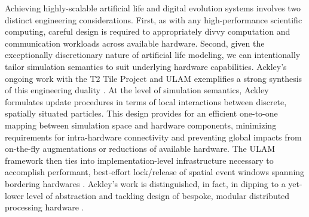 Achieving highly-scalable artificial life and digital evolution systems involves two distinct engineering considerations.
First, as with any high-performance scientific computing, careful design is required to appropriately divvy computation and communication workloads across available hardware.
Second, given the exceptionally discretionary nature of artificial life modeling, we can intentionally tailor simulation semantics to suit underlying hardware capabilities.
Ackley's ongoing work with the T2 Tile Project and ULAM exemplifies a strong synthesis of this engineering duality \citep{ackley2016ulam}.
At the level of simulation semantics, Ackley formulates update procedures in terms of local interactions between discrete, spatially situated particles.
This design provides for an efficient one-to-one mapping between simulation space and hardware components, minimizing requirements for intra-hardware connectivity and preventing global impacts from on-the-fly augmentations or reductions of available hardware.
The ULAM framework then ties into implementation-level infrastructure necessary to accomplish performant, best-effort lock/release of spatial event windows spanning bordering hardwares \citep{ackley2013movable}.
Ackley's work is distinguished, in fact, in dipping to a yet-lower level of abstraction and tackling design of bespoke, modular distributed processing hardware \citep{ackley2011homeostatic,ackley2023robust,livingcomputationSFBSanta}.

